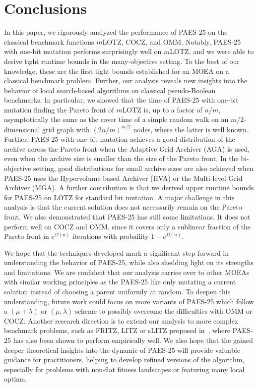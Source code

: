 \documentclass[
sigconf = false, %
review = false, %
screen = true, %
anonymous = true, %
format=acmsmall
]{acmart}
\newcommand{\OMM}{\textsc{OMM}\xspace}
\newcommand{\COCZ}{\textsc{COCZ}\xspace}
\newcommand{\LOTZ}{\textsc{LOTZ}\xspace}
\newcommand{\mLOTZ}{\ensuremath{m}\text{-}\textsc{LOTZ}\xspace}
\newcommand{\PAES}{PAES-25\xspace}
\begin{document}
\section{Conclusions}
In this paper, we rigorously analyzed the performance of \PAES on the classical benchmark functions \mLOTZ, \COCZ, and \OMM. Notably, \PAES with one-bit mutation performs surprisingly well on \mLOTZ, and we were able to derive tight runtime bounds in the many-objective setting. To the best of our knowledge, these are the first tight bounds established for an MOEA on a classical benchmark problem. Further, our analysis reveals new insights into the behavior of local search-based algorithms on classical pseudo-Boolean benchmarks. In particular, we showed that the time of \PAES with one-bit mutation finding the Pareto front of \mLOTZ is, up to a factor of $n/m$, asymptotically the same as the cover time of a simple random walk on an $m/2$-dimensional grid graph with $(2n/m)^{m/2}$ nodes, where the latter is well known. Further, \PAES with one-bit mutation achieves a good distribution of the archive across the Pareto front when the Adaptive Grid Archiver (AGA) is used, even when the archive size is smaller than the size of the Pareto front. In the bi-objective setting, good distributions for small archive sizes are also achieved when \PAES uses the Hypervolume based Archiver (HVA) or the Multi-level Grid Archiver (MGA). A further contribution is that we derived upper runtime bounds for \PAES on \LOTZ for standard bit mutation. A major challenge in this analysis is that the current solution does not necessarily remain on the Pareto front. We also demonstrated that \PAES has still some limitations. It does not perform well on \COCZ and \OMM, since it covers only a sublinear fraction of the Pareto front in $e^{\Omega(n)}$ iterations with probaility $1-e^{\Omega(n)}$.

We hope that the techniques developed mark a significant step forward in understanding the behavior of \PAES, while also shedding light on its strengths and limitations. We are confident that our analysis carries over to other MOEAs with similar working principles as the PAES-25 like only mutating a current solution instead of choosing a parent uniformly at random. To deepen this understanding, future work could focus on more variants of \PAES which follow a $(\mu+\lambda)$ or $(\mu,\lambda)$ scheme to possibly overcome the difficulties with \OMM or \COCZ. Another research direction is to extend our analysis to more complex benchmark problems, such as FRITZ, LITZ or sLITZ proposed in~\cite{Knowles2025}, where \PAES has also been shown to perform empirically well. We also hope that the gained deeper theoretical insights into the dynamic of \PAES will provide valuable guidance for practitioners, helping to develop refined versions of the algorithm, especially for problems with non-flat fitness landscapes or featuring many local optima.
\end{document}
